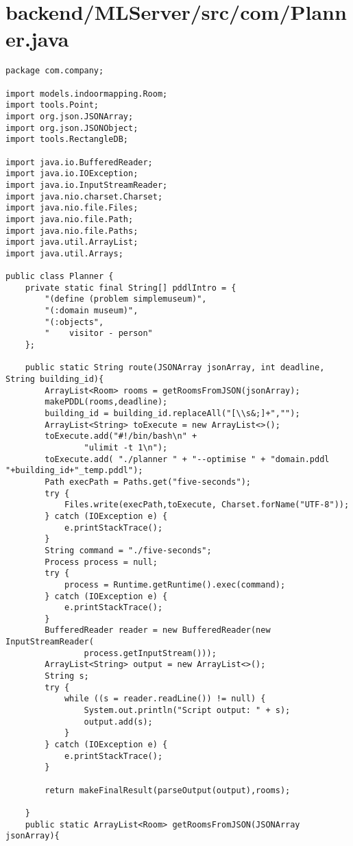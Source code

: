 \section{backend/MLServer/src/com/Planner.java}
\begin{lstlisting}package com.company;

import models.indoormapping.Room;
import tools.Point;
import org.json.JSONArray;
import org.json.JSONObject;
import tools.RectangleDB;

import java.io.BufferedReader;
import java.io.IOException;
import java.io.InputStreamReader;
import java.nio.charset.Charset;
import java.nio.file.Files;
import java.nio.file.Path;
import java.nio.file.Paths;
import java.util.ArrayList;
import java.util.Arrays;

public class Planner {
    private static final String[] pddlIntro = {
        "(define (problem simplemuseum)",
        "(:domain museum)",
        "(:objects",
        "    visitor - person"
    };

    public static String route(JSONArray jsonArray, int deadline, String building_id){
        ArrayList<Room> rooms = getRoomsFromJSON(jsonArray);
        makePDDL(rooms,deadline);
        building_id = building_id.replaceAll("[\\s&;]+","");
        ArrayList<String> toExecute = new ArrayList<>();
        toExecute.add("#!/bin/bash\n" +
                "ulimit -t 1\n");
        toExecute.add( "./planner " + "--optimise " + "domain.pddl "+building_id+"_temp.pddl");
        Path execPath = Paths.get("five-seconds");
        try {
            Files.write(execPath,toExecute, Charset.forName("UTF-8"));
        } catch (IOException e) {
            e.printStackTrace();
        }
        String command = "./five-seconds";
        Process process = null;
        try {
            process = Runtime.getRuntime().exec(command);
        } catch (IOException e) {
            e.printStackTrace();
        }
        BufferedReader reader = new BufferedReader(new InputStreamReader(
                process.getInputStream()));
        ArrayList<String> output = new ArrayList<>();
        String s;
        try {
            while ((s = reader.readLine()) != null) {
                System.out.println("Script output: " + s);
                output.add(s);
            }
        } catch (IOException e) {
            e.printStackTrace();
        }

        return makeFinalResult(parseOutput(output),rooms);

    }
    public static ArrayList<Room> getRoomsFromJSON(JSONArray jsonArray){


\end{lstlisting}
